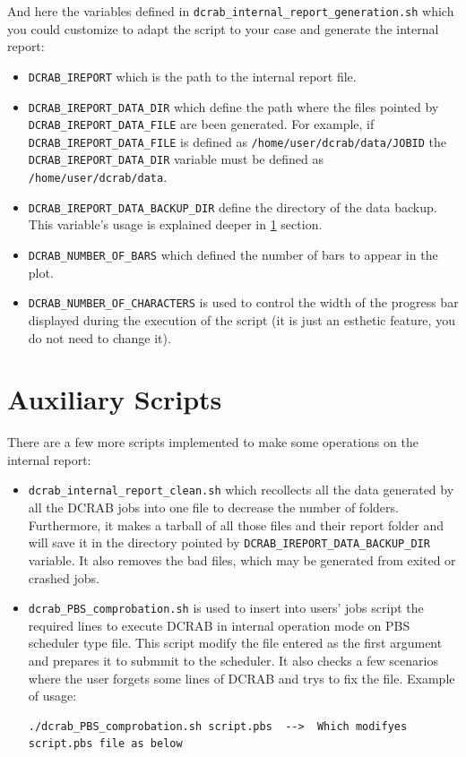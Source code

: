 \documentclass[10pt,a4paper]{report}
\begin{document}
And here the variables defined in \texttt{dcrab\_internal\_report\_generation.sh} which you could customize to adapt the script to your case and generate the internal report:

\begin{itemize}
  \item \texttt{DCRAB\_IREPORT} which is the path to the internal report file.
  \item \texttt{DCRAB\_IREPORT\_DATA\_DIR} which define the path where the files pointed by \verb+DCRAB_IREPORT_DATA_FILE+ are been generated. For example, if \verb+DCRAB_IREPORT_DATA_FILE+ is defined as \verb+/home/user/dcrab/data/JOBID+ the \verb+DCRAB_IREPORT_DATA_DIR+ variable must be defined as \verb+/home/user/dcrab/data+.
  \item \texttt{DCRAB\_IREPORT\_DATA\_BACKUP\_DIR} define the directory of the data backup. This variable's usage is explained deeper in \ref{intReportAuxScripts} section.
  \item \texttt{DCRAB\_NUMBER\_OF\_BARS} which defined the number of bars to appear in the plot.
  \item \texttt{DCRAB\_NUMBER\_OF\_CHARACTERS} is used to control the width of the progress bar displayed during the execution of the script (it is just an esthetic feature, you do not need to change it).
\end{itemize}

\section{Auxiliary Scripts}
\label{intReportAuxScripts}

There are a few more scripts implemented to make some operations on the internal report:

\begin{itemize}
  \item \texttt{dcrab\_internal\_report\_clean.sh} which recollects all the data generated by all the DCRAB jobs into one file to decrease the number of folders. Furthermore, it makes a tarball of all those files and their report folder and will save it in the directory pointed by \texttt{DCRAB\_IREPORT\_DATA\_BACKUP\_DIR} variable. It also removes the bad files, which may be generated from exited or crashed jobs.
  \item \texttt{dcrab\_PBS\_comprobation.sh} is used to insert into users' jobs script the required lines to execute DCRAB in internal operation mode on PBS scheduler type file. This script modify the file entered as the first argument and prepares it to submmit to the scheduler. It also checks a few scenarios where the user forgets some lines of DCRAB and trys to fix the file. Example of usage:

\begin{verbatim}
./dcrab_PBS_comprobation.sh script.pbs  -->  Which modifyes script.pbs file as below
\end{verbatim}
\end{itemize}
\end{document}
